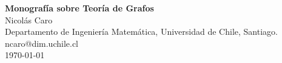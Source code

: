\documentclass{amsbook}
\theoremstyle{mytheoremstyle}
\theoremstyle{plain}
\theoremstyle{remark}
\numberwithin{section}{chapter}
\numberwithin{equation}{chapter}
\begin{document}
\setlength{\belowdisplayshortskip}{10pt}
\setlength{\abovedisplayshortskip}{10pt}

\frontmatter

\begin{titlepage}
\begin{center}
\Huge{\textbf{Monografía sobre Teoría de Grafos}}\\[1cm]
\Large{Nicolás Caro}\\[1cm]
\large{Departamento de Ingeniería Matemática, Universidad de Chile, Santiago.}\\[1cm]
\large{ncaro@dim.uchile.cl}\\
\vspace*{\fill}
\large{\today}

\end{center}
\end{titlepage}

\setcounter{page}{4}
\tableofcontents



\mainmatter

%
%

%

\backmatter

%

%
\end{document}
